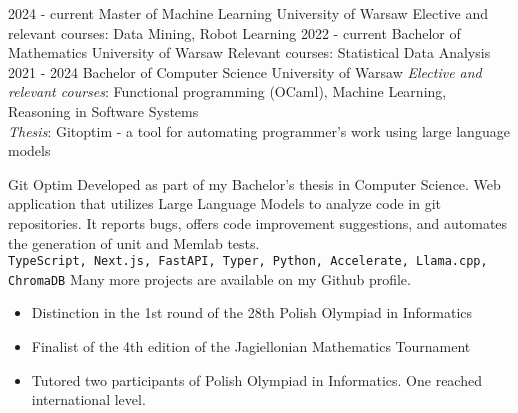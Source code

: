 \documentclass[9pt]{developercv} %
\begin{document}
\vspace{-15 pt}
\begin{entrylist}
    \entry
		{2024 - current}
		{Master of Machine Learning}
		{University of Warsaw}
		{Elective and relevant courses: Data Mining, Robot Learning}
    \entry
		{2022 - current}
		{Bachelor of Mathematics }
		{University of Warsaw}
		{Relevant courses: Statistical Data Analysis}
    \entry
		{2021 - 2024}
		{Bachelor of Computer Science}
		{University of Warsaw}
		{\textsl{Elective and relevant courses}: Functional programming (OCaml), Machine Learning, Reasoning in Software Systems\\ \textsl{Thesis}: Gitoptim - a tool for automating programmer's work using large language models}
\end{entrylist}

\vspace{-15 pt}
\begin{entrylist}
    \entry
		{\phantom}
		{Git Optim}
		{}
		{Developed as part of my Bachelor's thesis in Computer Science. Web application that utilizes Large Language Models to analyze code in git repositories. It reports bugs, offers code improvement suggestions, and automates the generation of unit and Memlab tests.\\[2mm]
        \texttt{TypeScript, Next.js, FastAPI, Typer, Python, Accelerate, Llama.cpp, ChromaDB}}
    \entry
		{}
		{\vspace{-3mm}}
		{}
		{Many more projects are available on my Github profile.}
\end{entrylist}

\vspace{-15 pt}
\vspace{-10 pt}
\begin{itemize}[parsep=0pt,partopsep=0pt,leftmargin=26mm]
    \item Distinction in the 1st round of the 28th Polish Olympiad in Informatics
    \item Finalist of the 4th edition of the Jagiellonian Mathematics Tournament
    \item Tutored two participants of Polish Olympiad in Informatics. One reached international level.
\end{itemize}
 
\end{document}
